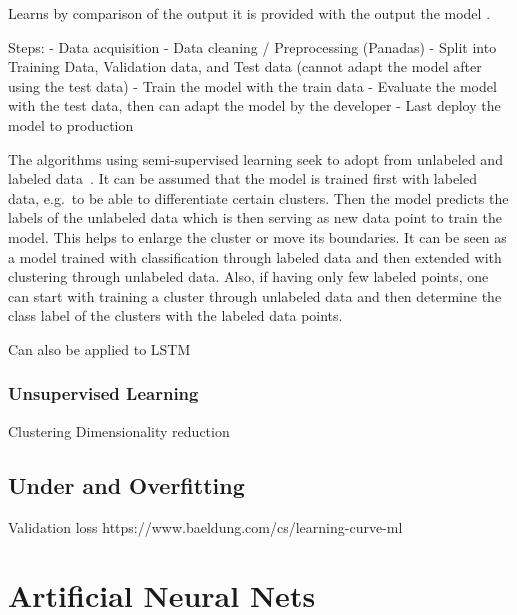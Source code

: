 Learns by comparison of the output it is provided with the output the model .

Steps:
- Data acquisition
- Data cleaning / Preprocessing (Panadas)
- Split into Training Data, Validation data, and Test data (cannot adapt the model after using the test data)
- Train the model with the train data
- Evaluate the model with the test data, then can adapt the model by the developer
- Last deploy the model to production



The algorithms using semi-supervised learning seek to adopt from unlabeled and labeled data~\cite{van2020survey}.
It can be assumed that the model is trained first with labeled data, e.g.\ to be able to differentiate certain clusters.
Then the model predicts the labels of the unlabeled data which is then serving as new data point to train the model.
This helps to enlarge the cluster or move its boundaries.
It can be seen as a model trained with classification through labeled data and then extended with clustering through unlabeled data.
Also, if having only few labeled points, one can start with training a cluster through unlabeled data and then determine the class label of the clusters with the labeled data points.


Can also be applied to LSTM

\subsubsection{Unsupervised Learning}
Clustering
Dimensionality reduction

\subsection{Under and Overfitting}
\label{subsec:under-and-overfitting}


Validation loss
https://www.baeldung.com/cs/learning-curve-ml

\section{Artificial Neural Nets}
\label{sec:artificial-neural-nets}

